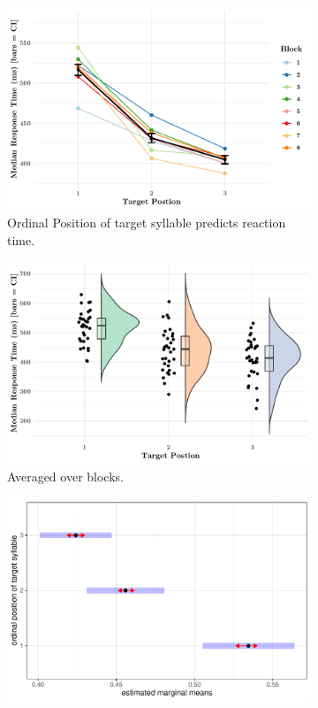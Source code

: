 \documentclass[11pt]{article}
\begin{document}
\begin{figure}[H]
	\begin{subfigure}[]{\linewidth}
		\centering
		\includegraphics[width=\textwidth]{exp3fig1a.pdf}
		\caption{Ordinal Position of target syllable predicts reaction time. }
	\end{subfigure}
	\newline
	\begin{subfigure}{.5\textwidth}
		\centering
		\includegraphics[width=\linewidth]{exp3fig1b.pdf}
		\caption{Averaged over blocks.}
	\end{subfigure}
	\begin{subfigure}{.5\textwidth}
		\centering
		\includegraphics[width=\linewidth]{exp3fig1c.pdf}

\end{subfigure}
\end{figure}
\end{document}
